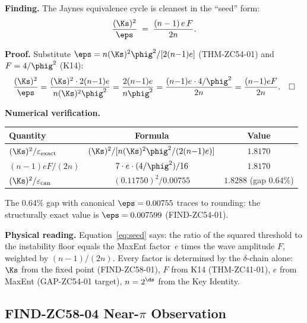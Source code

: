 \documentclass[12pt, a4paper]{article}
\begin{document}
\begin{derivedbox}[title={FIND-ZC58-03: Seed Equation
  $(\Ks)^2/\eps=(n{-}1)eF/(2n)$ ($R_0$, Exact)}]
\textbf{Finding.}
The Jaynes equivalence cycle is cleanest in the ``seed'' form:
\begin{equation}
  \frac{(\Ks)^2}{\eps}
  \;=\; \frac{(n-1)\,e\,F}{2n}.
  \label{eq:seed}
\end{equation}

\textbf{Proof.}
Substitute $\eps=n({\Ks})^2\phig^2/[2(n{-}1)e]$ (THM-ZC54-01)
and $F=4/\phig^2$ (K14):
\[
  \frac{({\Ks})^2}{\eps}
  = \frac{({\Ks})^2\cdot2(n{-}1)e}{n({\Ks})^2\phig^2}
  = \frac{2(n{-}1)e}{n\phig^2}
  = \frac{(n{-}1)e\cdot4/\phig^2}{2n}
  = \frac{(n{-}1)eF}{2n}.\quad\square
\]

\textbf{Numerical verification.}
\begin{center}
\begin{tabular}{@{}lcc@{}}
\toprule
Quantity & Formula & Value \\
\midrule
$(\Ks)^2/\varepsilon_{\rm exact}$ &
  $(\Ks)^2/[n({\Ks})^2\phig^2/(2(n{-}1)e)]$ &
  $1.8170$ \\
$(n{-}1)eF/(2n)$ &
  $7\cdot e\cdot(4/\phig^2)/16$ &
  $1.8170$ \\
$(\Ks)^2/\varepsilon_{\rm can}$ &
  $(0.11750)^2/0.00755$ &
  $1.8288$ (gap $0.64\%$) \\
\bottomrule
\end{tabular}
\end{center}
The $0.64\%$ gap with canonical $\eps=0.00755$ traces to
rounding: the structurally exact value is
$\eps=0.007599$ (FIND-ZC54-01).

\textbf{Physical reading.}
Equation~\eqref{eq:seed} says: the ratio of the
squared threshold to the instability floor equals
the MaxEnt factor~$e$ times the wave amplitude $F$,
weighted by $(n{-}1)/(2n)$.
Every factor is determined by the $\delta$-chain alone:
$\Ks$ from the fixed point (FIND-ZC58-01),
$F$ from K14 (THM-ZC41-01),
$e$ from MaxEnt (GAP-ZC54-01 target),
$n=2^{\ds}$ from the Key Identity.
\end{derivedbox}

\subsection{FIND-ZC58-04 \quad Near-$\pi$ Observation}
\label{sec:find04}

\end{document}
